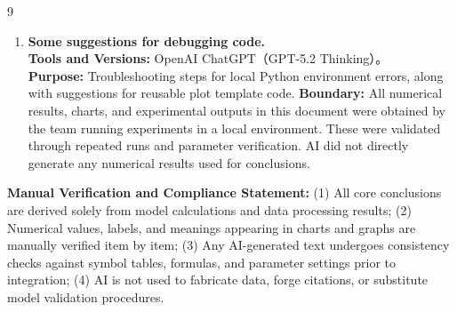\documentclass{mcmthesis}
\begin{document}
\begin{ReportAiUse}{9}
\begin{enumerate}
\item \textbf{Some suggestions for debugging code.}\\
\textbf{Tools and Versions:} OpenAI ChatGPT（GPT-5.2 Thinking）。\\
\textbf{Purpose:} Troubleshooting steps for local Python environment errors, along with suggestions for reusable plot template code.
\textbf{Boundary:} All numerical results, charts, and experimental outputs in this document were obtained by the team running experiments in a local environment. These were validated through repeated runs and parameter verification. AI did not directly generate any numerical results used for conclusions.

\end{enumerate}

\noindent \textbf{Manual Verification and Compliance Statement:}
(1) All core conclusions are derived solely from model calculations and data processing results;
(2) Numerical values, labels, and meanings appearing in charts and graphs are manually verified item by item;
(3) Any AI-generated text undergoes consistency checks against symbol tables, formulas, and parameter settings prior to integration;
(4) AI is not used to fabricate data, forge citations, or substitute model validation procedures.

\end{ReportAiUse}
\end{document}
